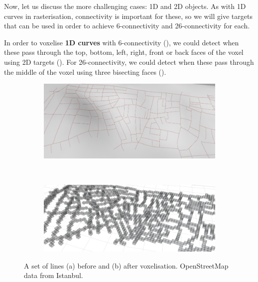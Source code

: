 Now, let us discuss the more challenging cases: 1D and 2D objects.
As with 1D curves in rasterisation, connectivity is important for these, so we will give targets that can be used in order to achieve 6-connectivity and 26-connectivity for each.

In order to voxelise \textbf{1D curves} with 6-connectivity (), we could detect when these pass through the top, bottom, left, right, front or back faces of the voxel using 2D targets ().
For 26-connectivity, we could detect when these pass through the middle of the voxel using three bisecting faces ().

\begin{figure}
\centering
\begin{subfigure}[b]{\linewidth}
\includegraphics[width=\linewidth]{figs/lines-pre}
\caption{}%
\label{subfig:lines-pre}
\end{subfigure}
\\
\begin{subfigure}[b]{\linewidth}
\includegraphics[width=\linewidth]{figs/lines-post}
\caption{}%
\label{subfig:lines-post}
\end{subfigure}
\caption{A set of lines (a) before and (b) after voxelisation. OpenStreetMap data from Istanbul.}%
\label{fig:lines}
\end{figure}

